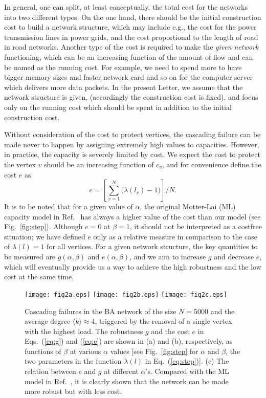 \documentclass[doublecol]{epl2}
\begin{document}
In general, one can split, at least conceptually, the total cost for
the networks into two different types: On the one hand, there should
be the initial construction cost to build a network structure, which
may include e.g., the cost for the power transmission lines in power
grids, and the cost proportional to the length of road in road
networks.  Another type of the cost is required to make the {\it
given network} functioning, which can be an increasing function of
the amount of flow and can be named as the running cost. For
example, we need to spend more to have bigger memory sizes and
faster network card and so on for the computer server which delivers
more data packets. In the present Letter, we assume that the network
structure is given, (accordingly the construction cost is fixed),
and focus only on the running cost which should be spent in addition
to the initial construction cost.

Without consideration of the cost to protect vertices, the cascading
failure can be made never to happen by assigning extremely high
values to capacities. However, in practice, the capacity is severely
limited by cost.
We expect the cost to protect the vertex $v$ should
be an increasing function of $c_v$, and for convenience define the
cost $e$ as
\begin{equation}
\label{eq:e} e = \left[\sum_{v=1}^N \bigl(\lambda(l_v) -1 \bigr)
\right]/N.
\end{equation}
It is to be noted that for a given value of $\alpha$, the original
Motter-Lai (ML)  capacity model in Ref.~\cite{CasModel} has always a
higher value of the cost than our model (see Fig.~\ref{fig:step}).
Although $e = 0$ at $\beta = 1$, it should not be interpreted as a
costfree situation; we have defined $e$ only as a relative measure
in comparison to the case of $\lambda(l) = 1$ for all vertices. For
a given network structure, the key quantities to be measured are
$g(\alpha,\beta)$ and $e(\alpha,\beta)$, and we aim to increase $g$
and decrease $e$, which will eventually provide us a way to achieve
the high robustness and the low cost at the same time.

\begin{figure}
\begin{center}
{\texttt{[image: fig2a.eps]}}
{\texttt{[image: fig2b.eps]}}
{\texttt{[image: fig2c.eps]}} \caption{
Cascading failures in the BA network of the size $N=5000$ and the
average degree $\langle k \rangle \approx 4$, triggered by the
removal of a single vertex with the highest load. The robustness $g$
and the cost $e$ in Eqs.~(\ref{eq:g}) and (\ref{eq:e}) are shown in
(a) and (b), respectively, as functions of $\beta$ at various
$\alpha$ values [see Fig.~\ref{fig:step} for $\alpha$ and $\beta$,
the two parameters in the function $\lambda(l)$ in
Eq.~(\ref{eq:step})]. (c) The relation between $e$ and $g$ at
different $\alpha$'s.  Compared with the ML model in
Ref.~\cite{CasModel}, it is clearly shown that the network can be
made more robust but with less cost. } \label{fig:BA}
\end{center}
\end{figure}
\end{document}
